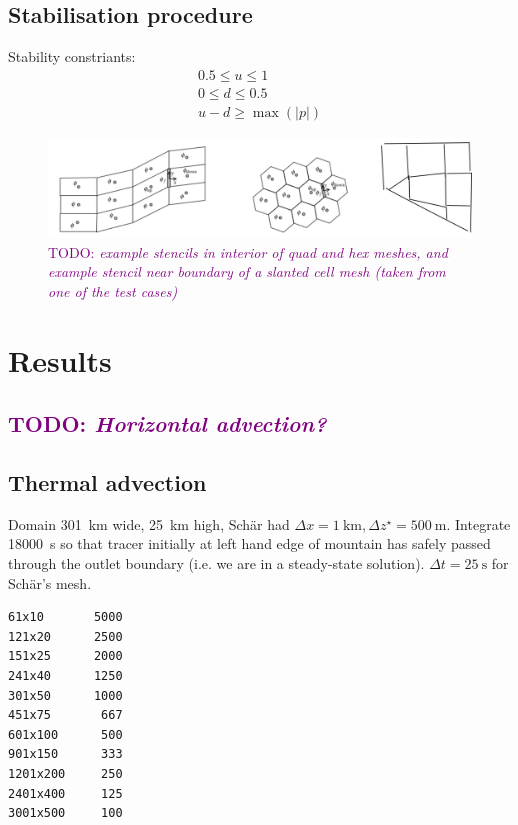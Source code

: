 \documentclass{article}
\newcommand{\TODO}[1]{\textcolor{purple}{TODO: \emph{#1}}}
\begin{document}
\subsection{Stabilisation procedure}

Stability constriants:
\begin{align}
	0.5 \leq u \leq 1 \\
	0 \leq d \leq 0.5 \\
	u - d \geq \max(|p|)
\end{align}

\begin{figure}
	\includegraphics[width=\textwidth]{stencilConstruction.png}
	\caption{\TODO{example stencils in interior of quad and hex meshes, and example stencil near boundary of a slanted cell mesh (taken from one of the test cases)}}
\end{figure}


\section{Results}
\subsection{\TODO{Horizontal advection?}}

\subsection{Thermal advection}

Domain \SI{301}{\kilo\meter} wide, \SI{25}{\kilo\meter} high, Sch\"ar had $\Delta x = \SI{1}{\kilo\meter}, \Delta z^\star = \SI{500}{\meter}$.  Integrate \SI{18000}{\second} so that tracer initially at left hand edge of mountain has safely passed through the outlet boundary (i.e. we are in a steady-state solution).  $\Delta t = \SI{25}{\second}$ for Sch\"ar's mesh.

\begin{table}
	\begin{verbatim}
61x10		5000
121x20		2500
151x25		2000
241x40		1250
301x50		1000
451x75		 667
601x100		 500
901x150		 333
1201x200	 250
2401x400	 125
3001x500	 100
	\end{verbatim}
	\caption{\TODO{suggested $x$ cells $\times$ $z$ cells $\times \Delta t$ resolutions for thermal advection convergence tests}}
\end{table}
\end{document}
